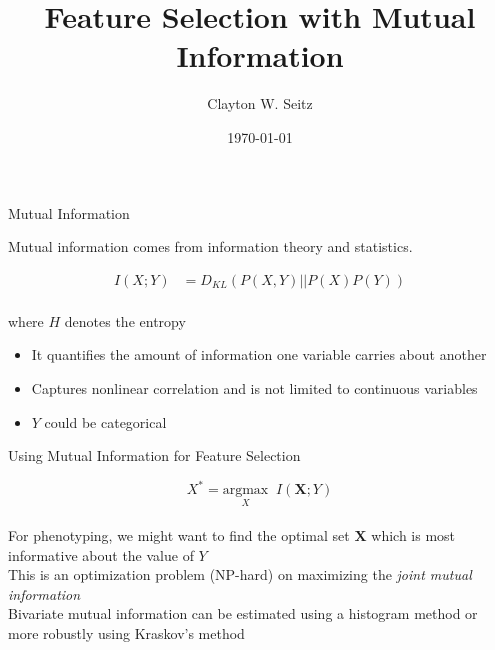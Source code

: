 \documentclass{beamer}					%
\title{Feature Selection with Mutual Information}	%
\author{Clayton W. Seitz}								%
\date{\today}									%
\begin{document}
\begin{frame}
  \titlepage
\end{frame}


%


\begin{frame}{Mutual Information}

Mutual information comes from information theory and statistics.

\begin{align*}
I(X;Y) &= D_{KL}(P(X,Y)||P(X)P(Y))\\
\end{align*}

where $H$ denotes the entropy\\
\vspace{0.1in}

\begin{itemize}
\item It quantifies the amount of information one variable carries about another
\item Captures nonlinear correlation and is not limited to continuous variables
\item $Y$ could be categorical
\end{itemize}

\end{frame}

\begin{frame}{Using Mutual Information for Feature Selection}

\begin{equation*}
X^{*} = \underset{X}{\mathrm{argmax}}\;\; I(\bm{X};Y)
\end{equation*}\\
\vspace{0.2in}
For phenotyping, we might want to find the optimal set $\bm{X}$ which is most informative about the value of $Y$\\
\vspace{0.2in}
This is an optimization problem (NP-hard) on maximizing the \emph{joint mutual information}\\
\vspace{0.2in}
Bivariate mutual information can be estimated using a histogram method or more robustly using Kraskov's method

\end{frame}
\end{document}
